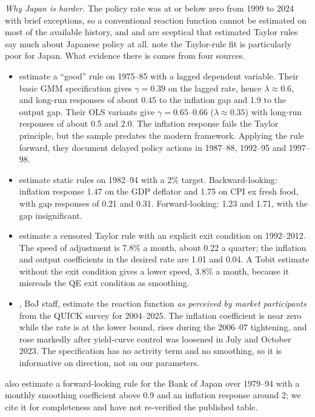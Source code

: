 \documentclass[11pt,a4paper]{article}
\begin{document}
\emph{Why Japan is harder.} The policy rate was at or below zero from 1999 to 2024 with brief exceptions, so a conventional reaction function cannot be estimated on most of the available history, and \textcite{kuttnerposen2004} and \textcite{itomishkin2004} are sceptical that estimated Taylor rules say much about Japanese policy at all. \textcite{nakamurasteinsson2025} note the Taylor-rule fit is particularly poor for Japan. What evidence there is comes from four sources.
\begin{itemize}
\item \textcite{jinushi2000} estimate a ``good'' rule on 1975--85 with a lagged dependent variable. Their basic GMM specification gives $\gamma=0.39$ on the lagged rate, hence $\lambda\approx0.6$, and long-run responses of about 0.45 to the inflation gap and 1.9 to the output gap. Their OLS variants give $\gamma=0.65$--$0.66$ ($\lambda\approx0.35$) with long-run responses of about 0.5 and 2.0. The inflation response fails the Taylor principle, but the sample predates the modern framework. Applying the rule forward, they document delayed policy actions in 1987--88, 1992--95 and 1997--98.
\item \textcite{itomishkin2004} estimate static rules on 1982--94 with a 2\% target. Backward-looking: inflation response 1.47 on the GDP deflator and 1.75 on CPI ex fresh food, with gap responses of 0.21 and 0.31. Forward-looking: 1.23 and 1.71, with the gap insignificant.
\item \textcite{hayashikoeda2019} estimate a censored Taylor rule with an explicit exit condition on 1992--2012. The speed of adjustment is 7.8\% a month, about 0.22 a quarter; the inflation and output coefficients in the desired rate are 1.01 and 0.04. A Tobit estimate without the exit condition gives a lower speed, 3.8\% a month, because it misreads the QE exit condition as smoothing.
\item \textcite{haba2026}, BoJ staff, estimate the reaction function \emph{as perceived by market participants} from the QUICK survey for 2004--2025. The inflation coefficient is near zero while the rate is at the lower bound, rises during the 2006--07 tightening, and rose markedly after yield-curve control was loosened in July and October 2023. The specification has no activity term and no smoothing, so it is informative on direction, not on our parameters.
\end{itemize}
\textcite{cgg1998} also estimate a forward-looking rule for the Bank of Japan over 1979--94 with a monthly smoothing coefficient above 0.9 and an inflation response around 2; we cite it for completeness and have not re-verified the published table.
\end{document}
